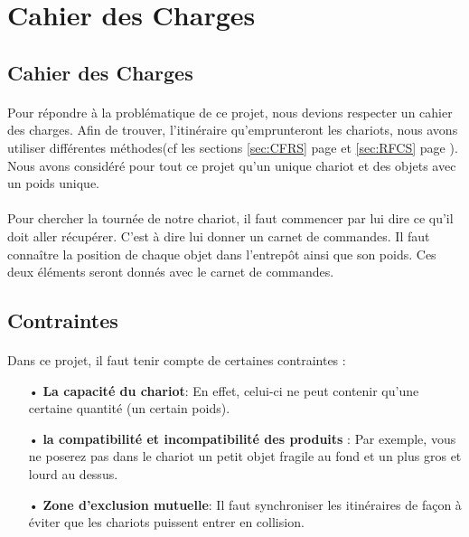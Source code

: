 \documentclass[twoside,UTF8]{EPURapport}
\begin{document}
\section{Cahier des Charges}
\subsection{Cahier des Charges}
\paragraph{}Pour répondre à la problématique de ce projet, nous devions respecter un cahier des charges. Afin de trouver, l'itinéraire qu'emprunteront les chariots, nous avons utiliser différentes méthodes(cf les sections \ref{sec:CFRS} page \pageref{sec:CFRS} et \ref{sec:RFCS} page \pageref{sec:RFCS}). Nous avons considéré pour tout ce projet qu'un unique chariot et des objets avec un poids unique. 

\paragraph{}Pour chercher la tournée de notre chariot, il faut commencer par lui dire ce qu'il doit aller récupérer. C'est à dire lui donner un carnet de commandes. Il faut connaître la position de chaque objet dans l'entrepôt ainsi que son poids. Ces deux éléments seront donnés avec le carnet de commandes.  

\subsection{Contraintes}
\label{sec:Contraintes}
\paragraph{}Dans ce projet, il faut tenir compte de certaines contraintes : 
\begin{itemize}
\item[•]\textbf{La capacité du chariot}: En effet, celui-ci ne peut contenir qu'une certaine quantité (un certain poids).
\item[•]\textbf{la compatibilité et incompatibilité des produits} : Par exemple, vous ne poserez pas dans le chariot un petit objet fragile au fond et un plus gros et lourd au dessus. 
\item[•]\textbf{Zone d'exclusion mutuelle}: Il faut synchroniser les itinéraires de façon à éviter que les chariots puissent entrer en collision. 
\end{itemize} 
\end{document}
